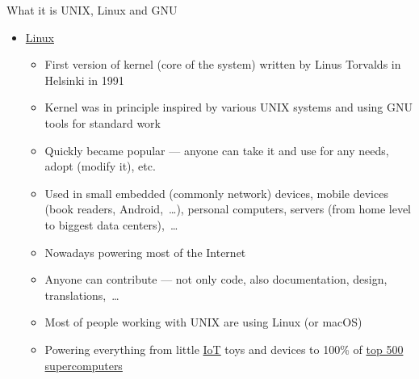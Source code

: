 \documentclass[compress, xelatex, 11pt, xcolor=svgnames, aspectratio=169, url={hyphens, lowtilde}]{beamer}
\begin{document}
\begin{frame}[allowframebreaks]{What it is UNIX, Linux and GNU}
\begin{itemize}
\begin{itemize}
			\item \enquote{GNU's Not Unix!} --- but it is compatible, respects its principles
			\item System written from scratch, following ideas of UNIX
			\item Since 1984 Richard Stallman (founder of \href{https://www.fsf.org/}{Free Software Foundation}) tried to make new kernel (Hurd --- not finished yet\ldots)
			\item Generally set of basic system tools --- working with many kernels (Linux, BSD*, macOS,~\ldots), also present in many commercial paid UNIX systems
			\item Source code is free and open --- anyone can study it (Security!), report bugs, contribute, modify, share it, get inspiration,~\ldots
			\item GNU General Public License (GPL) --- free spirit of open-source --- license, idea, how to share software to benefit everyone
			\item Inspired open public software development --- crucial for our usage of Linux \& al.
		\end{itemize}
		\item \href{https://en.wikipedia.org/wiki/Linux}{Linux}
		\begin{itemize}
			\item First version of kernel (core of the system) written by Linus Torvalds in Helsinki in 1991
			\item Kernel was in principle inspired by various UNIX systems and using GNU tools for standard work
			\item Quickly became popular --- anyone can take it and use for any needs, adopt (modify it), etc.
			\item Used in small embedded (commonly network) devices, mobile devices (book readers, Android,~\ldots), personal computers, servers (from home level to biggest data centers),~\ldots
			\item Nowadays powering most of the Internet
			\item Anyone can contribute --- not only code, also documentation, design, translations,~\ldots
			\item Most of people working with UNIX are using Linux (or macOS)
			\item Powering everything from little \href{https://en.wikipedia.org/wiki/Internet_of_things}{IoT} toys and devices to 100\% of \href{https://www.top500.org/lists/top500/}{top 500 supercomputers}
		\end{itemize}

\end{itemize}
\end{frame}
\end{document}
